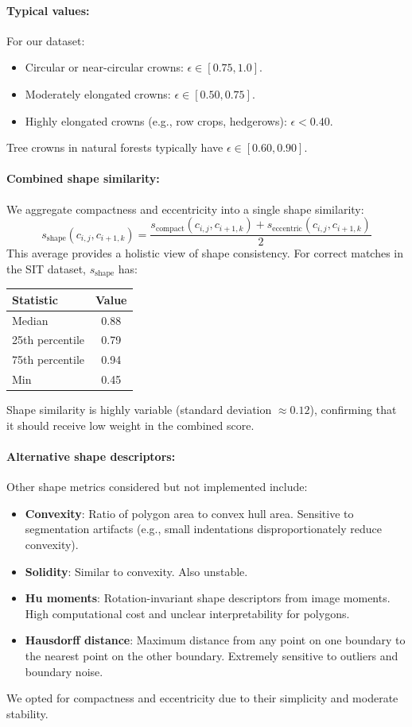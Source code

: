 \paragraph{Typical values:}
For our dataset:
\begin{itemize}
    \item Circular or near-circular crowns: $\epsilon \in [0.75, 1.0]$.
    \item Moderately elongated crowns: $\epsilon \in [0.50, 0.75]$.
    \item Highly elongated crowns (e.g., row crops, hedgerows): $\epsilon < 0.40$.
\end{itemize}
Tree crowns in natural forests typically have $\epsilon \in [0.60, 0.90]$.

\paragraph{Combined shape similarity:}
We aggregate compactness and eccentricity into a single shape similarity:
\[
s_{\text{shape}}(c_{i,j}, c_{i+1,k}) = \frac{s_{\text{compact}}(c_{i,j}, c_{i+1,k}) + s_{\text{eccentric}}(c_{i,j}, c_{i+1,k})}{2}
\]
This average provides a holistic view of shape consistency. For correct matches in the SIT dataset, $s_{\text{shape}}$ has:
\begin{center}
\begin{tabular}{lc}
\toprule
Statistic & Value \\
\midrule
Median & 0.88 \\
25th percentile & 0.79 \\
75th percentile & 0.94 \\
Min & 0.45 \\
\bottomrule
\end{tabular}
\end{center}
Shape similarity is highly variable (standard deviation $\approx 0.12$), confirming that it should receive low weight in the combined score.

\paragraph{Alternative shape descriptors:}
Other shape metrics considered but not implemented include:
\begin{itemize}
    \item \textbf{Convexity}: Ratio of polygon area to convex hull area. Sensitive to segmentation artifacts (e.g., small indentations disproportionately reduce convexity).
    \item \textbf{Solidity}: Similar to convexity. Also unstable.
    \item \textbf{Hu moments}: Rotation-invariant shape descriptors from image moments. High computational cost and unclear interpretability for polygons.
    \item \textbf{Hausdorff distance}: Maximum distance from any point on one boundary to the nearest point on the other boundary. Extremely sensitive to outliers and boundary noise.
\end{itemize}
We opted for compactness and eccentricity due to their simplicity and moderate stability.

